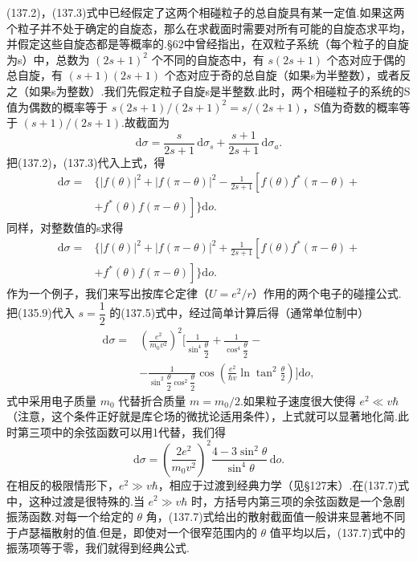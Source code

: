 (137.2)，(137.3)式中已经假定了这两个相碰粒子的总自旋具有某一定值.如果这两个粒子并不处于确定的自旋态，那么在求截面时需要对所有可能的自旋态求平均，并假定这些自旋态都是等概率的.§62中曾经指出，在双粒子系统（每个粒子的自旋为s）中，总数为 $(2s+1)^2$ 个不同的自旋态中，有 $s(2s+1)$ 个态对应于偶的总自旋，有 $(s+1)(2s+1)$ 个态对应于奇的总自旋（如果s为半整数），或者反之（如果s为整数）.我们先假定粒子自旋s是半整数.此时，两个相碰粒子的系统的S值为偶数的概率等于
$s(2s+1)/(2s+1)^2=s/(2s+1)$，S值为奇数的概率等于
$(s+1)/(2s+1)$.故截面为
\begin{equation}
  \mathrm{d}\sigma=\frac{s}{2s+1}\,\mathrm{d}\sigma_{s}
  +\frac{s+1}{2s+1}\,\mathrm{d}\sigma_{a}.
\end{equation}
把(137.2)，(137.3)代入上式，得
\begin{equation}
\begin{aligned}
  \mathrm{d}\sigma={}&\bigl\{|f(\theta)|^2+|f(\pi-\theta)|^2
  -\frac{1}{2s+1}\left[f(\theta)f^{*}(\pi-\theta)+\right.\\
  &\left.+f^{*}(\theta)f(\pi-\theta)\right]\bigr\}\mathrm{d}o.
\end{aligned}
\end{equation}
同样，对整数值的s求得
\begin{equation}
\begin{aligned}
  \mathrm{d}\sigma={}&\bigl\{|f(\theta)|^2+|f(\pi-\theta)|^2
  +\frac{1}{2s+1}\left[f(\theta)f^{*}(\pi-\theta)+\right.\\
  &\left.+f^{*}(\theta)f(\pi-\theta)\right]\bigr\}\mathrm{d}o.
\end{aligned}
\end{equation}
作为一个例子，我们来写出按库仑定律（$U=e^2/r$）作用的两个电子的碰撞公式.把(135.9)代入 $s=\dfrac{1}{2}$ 的(137.5)式中，经过简单计算后得（通常单位制中）
\begin{equation}
\begin{aligned}
  \mathrm{d}\sigma={}&\left(\frac{e^2}{m_0v^2}\right)^{2}
  \biggl[\frac{1}{\sin^4\dfrac{\theta}{2}}
  +\frac{1}{\cos^4\dfrac{\theta}{2}}-\\
  &-\frac{1}{\sin^2\dfrac{\theta}{2}\cos^2\dfrac{\theta}{2}}
  \cos\left(\frac{e^2}{\hbar v}\ln\tan^2\frac{\theta}{2}\right)
  \biggr]\mathrm{d}o,
\end{aligned}
\end{equation}
式中采用电子质量 $m_0$ 代替折合质量 $m=m_0/2$.如果粒子速度很大使得 $e^2\ll v\hbar$（注意，这个条件正好就是库仑场的微扰论适用条件），上式就可以显著地化简.此时第三项中的余弦函数可以用1代替，我们得
\begin{equation}
  \mathrm{d}\sigma=\left(\frac{2e^2}{m_0v^2}\right)^{2}
  \frac{4-3\sin^2\theta}{\sin^4\theta}\,\mathrm{d}o.
\end{equation}
在相反的极限情形下，$e^2\gg v\hbar$，相应于过渡到经典力学（见§127末）.在(137.7)式中，这种过渡是很特殊的.当 $e^2\gg v\hbar$ 时，方括号内第三项的余弦函数是一个急剧振荡函数.对每一个给定的 $\theta$ 角，(137.7)式给出的散射截面值一般讲来显著地不同于卢瑟福散射的值.但是，即使对一个很窄范围内的 $\theta$ 值平均以后，(137.7)式中的振荡项等于零，我们就得到经典公式.

